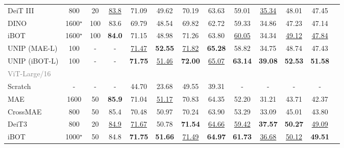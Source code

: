 \begin{table}[t]
{{\begin{tabular}{l c c c c  c c c c c c c c}
        \rowcolor{orange!15} DeiT III \citep{deit3} & 800 & 20 & \underline{83.8} & 71.09 & 49.62 & 70.19 & 63.63 & 59.01 & \underline{35.34} & 48.01 & 47.45 \\
        \rowcolor{orange!15} DINO \citep{dino} & 1600$^\star$ & 100 & 83.6 & 69.79 & 48.54 & 69.82 & 62.72 & 59.33 & 34.86 & 47.23 & 47.14 \\
        \rowcolor{orange!15} iBOT \citep{iBOT} & 1600$^\star$ & 100 & \textbf{84.0} & 71.15 & 48.98 & 71.26 & 63.80 & \underline{60.05} & 34.34 & \underline{49.12} & \underline{47.84} \\
        \rowcolor{cyan!15} UNIP (MAE-L) & 100 & - & - & \underline{71.47} & \textbf{52.55} & \underline{71.82} & \textbf{65.28} & 58.82 & 34.75 & 48.74 & 47.43 \\
        \rowcolor{cyan!15} UNIP (iBOT-L) & 100 & - & - & \textbf{71.75} & \underline{51.46} & \textbf{72.00} & \underline{65.07} & \textbf{63.14} & \textbf{39.08} & \textbf{52.53} & \textbf{51.58} \\
        \midrule
        \textcolor{gray}{ViT-Large/16} & & & & & & & & & & & \\
        Scratch & - & - & - & 44.70 & 23.68 & 49.55 & 39.31 & - & - & - & - \\
        \rowcolor{gray!15} MAE \citep{mae} & 1600 & 50 & \textbf{85.9} & 71.04 & \underline{51.17} & 70.83 & 64.35 & 52.20 & 31.21 & 43.71 & 42.37 \\
        \rowcolor{gray!15} CrossMAE \citep{crossmae} & 800 & 50 & 85.4 & 70.48 & 50.97 & 70.24 & 63.90 & 53.29 & 33.09 & 45.01 & 43.80 \\
        \rowcolor{orange!15} DeiT3 \citep{deit3} & 800 & 20 & \underline{84.9} & \underline{71.67} & 50.78 & \textbf{71.54} & \underline{64.66} & \underline{59.42} & \textbf{37.57} & \textbf{50.27} & \underline{49.09} \\
        \rowcolor{orange!15} iBOT \citep{iBOT} & 1000$^\star$ & 50 & 84.8 & \textbf{71.75} & \textbf{51.66} & \underline{71.49} & \textbf{64.97} & \textbf{61.73} & \underline{36.68} & \underline{50.12} & \textbf{49.51} \\
        \bottomrule
    \end{tabular}}}
    \vspace{-2mm}
\end{table}